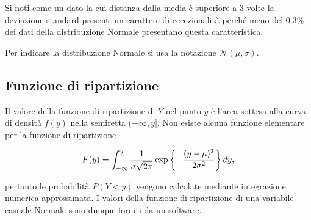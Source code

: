\documentclass[
  11pt,
]{krantz}
\theoremstyle{definition}
\theoremstyle{definition}
\theoremstyle{definition}
\theoremstyle{definition}
\theoremstyle{remark}
\begin{document}
\noindent Si noti come un dato la cui distanza dalla media è superiore a 3 volte la deviazione standard presenti un carattere di eccezionalità perché meno del 0.3\% dei dati della distribuzione Normale presentano questa caratteristica.

Per indicare la distribuzione Normale si usa la notazione \(\mathcal{N}(\mu, \sigma)\).

\hypertarget{funzione-di-ripartizione-1}{%
\subsection{Funzione di ripartizione}\label{funzione-di-ripartizione-1}}

Il valore della funzione di ripartizione di \(Y\) nel punto \(y\) è l'area sottesa alla curva di densità \(f(y)\) nella semiretta \((-\infty, y]\). Non esiste alcuna funzione elementare per la funzione di ripartizione

\begin{equation}
F(y) = \int_{-\infty}^y {1 \over {\sigma\sqrt{2\pi} }} \exp \left\{-\frac{(y - \mu)^2}{2\sigma^2} \right\} dy, 
\end{equation}

pertanto le probabilità \(P(Y < y)\) vengono calcolate mediante integrazione numerica approssimata. I valori della funzione di ripartizione di una variabile casuale Normale sono dunque forniti da un software.
\end{document}
